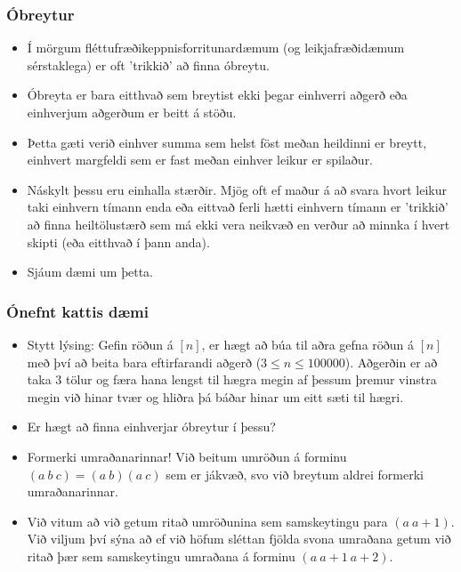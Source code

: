 \documentclass{beamer}
\begin{document}
\begin{frame}
\frametitle{Óbreytur}

\begin{itemize}

\item<1-> Í mörgum fléttufræðikeppnisforritunardæmum (og leikjafræðidæmum sérstaklega) er oft 'trikkið' að finna óbreytu.

\item<2-> Óbreyta er bara eitthvað sem breytist ekki þegar einhverri aðgerð eða einhverjum aðgerðum er beitt á stöðu.

\item<3-> Þetta gæti verið einhver summa sem helst föst meðan heildinni er breytt, einhvert margfeldi sem er fast meðan einhver leikur er spilaður.

\item<4-> Náskylt þessu eru einhalla stærðir. Mjög oft ef maður á að svara hvort leikur taki einhvern tímann enda eða eittvað ferli hætti einhvern tímann er 'trikkið' að finna heiltölustærð sem má ekki vera neikvæð en verður að minnka í hvert skipti (eða eitthvað í þann anda).

\item<5-> Sjáum dæmi um þetta.

\end{itemize}

\end{frame}

\begin{frame}
\frametitle{Ónefnt kattis dæmi}

\begin{itemize}

\item<1-> Stytt lýsing: Gefin röðun á $[n]$, er hægt að búa til aðra gefna röðun á $[n]$ með því að beita bara eftirfarandi aðgerð ($3 \leq n \leq 100000$). Aðgerðin er að taka 3 tölur og færa hana lengst til hægra megin af þessum þremur vinstra megin við hinar tvær og hliðra þá báðar hinar um eitt sæti til hægri.

\item<2-> Er hægt að finna einhverjar óbreytur í þessu?

\item<3-> Formerki umraðanarinnar! Við beitum umröðun á forminu $(a \ b \ c) = (a \ b)(a \ c)$ sem er jákvæð, svo við breytum aldrei formerki umraðanarinnar.

\item<4-> Við vitum að við getum ritað umröðunina sem samskeytingu para $(a \ a + 1)$. Við viljum því sýna að ef við höfum sléttan fjölda svona umraðana getum við ritað þær sem samskeytingu umraðana á forminu $(a \ a + 1 \ a + 2)$.

\end{itemize}

\end{frame}
\end{document}
